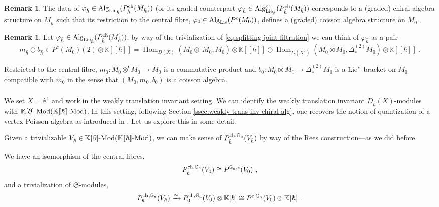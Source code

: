 \documentclass[11pt]{amsart}
\numberwithin{equation}{section}
\theoremstyle{definition}
\newtheorem{rmk}[theo]{Remark}
\newcommand{\bb}{\mathbb}
\newcommand{\mf}{\mathfrak}
\newcommand{\fph}{{[\![\hbar]\!]}}
\newcommand{\gd}{{\textup{gr}}}
\DeclareMathOperator{\Hom}{Hom}
\newcommand{\Mod}{{\textup{-Mod}}}
\newcommand{\ik}{{\bb K}}
\newcommand{\Alg}{{\textup{Alg}}}
\newcommand{\Lie}{{\textup{Lie}}}
\newcommand{\ch}{{\textup{ch}}}
\newcommand{\Ss}{{{\mf{S}}}}
\newcommand{\0}{{\textbf{0}}}
\newcommand{\del}{{{\partial}}}
\def\IA{\mathbb{A}}
\def\IG{\mathbb{G}}
\def\ch{{\rm ch}}
\def \mf{\mathfrak}
\def \hhb{{\hat \hbar}}
\begin{document}
\begin{rmk}\label{rmk:algebras in chiral Rees}
	The data of $\varphi_{\hat \hbar}\in \Alg_{\Lie_{\hat \hbar}}(P^\ch_{\hat \hbar}(M_{\hat \hbar}))$ (or its graded counterpart $\varphi_{\hat \hbar} \in \Alg^\gd_{\Lie_{\hat \hbar}}(P^\ch_{\hat \hbar}(M_{\hat \hbar}))$ corresponds to a (graded) chiral algebra structure on $M_{\hat \hbar}$ such that its restriction to the central fibre, $\varphi_0\in \Alg_{\Lie}(P^c(M_0))$, defines a (graded) coisson algebra structure on $M_0$.

\end{rmk}

\begin{rmk}\label{rmk:concrete algebraic sturcture in chiral Rees}
Let $\varphi_{\hat \hbar} \in \Alg_{\Lie_{\hat \hbar}}(P^\ch_{\hat \hbar}(M_{\hat \hbar}))$, by way of the trivialization of \eqref{eq:splitting joint filtration} we can think of $\varphi_{\hat \hbar}$ as a pair 
\[
m_{\hat \hbar}\oplus b_{\hat \hbar} \in P^c(M_0)(2)\otimes \ik\fph =  \Hom_{D(X)}(M_0\otimes^!M_0,M_0)\otimes\ik\fph\oplus \Hom_{D(X^2)}(M_0\boxtimes M_0,\Delta^{(2)}_*M_0)\otimes \ik\fph~.
\]

Restricted to the central fibre, $m_0 : M_0\otimes^!M_0\rightarrow M_0$ is a commutative product and $b_0:M_0\boxtimes M_0\to \Delta^{(2)}_*M_0$ is a $\Lie^*$-bracket on $M_0$ compatible with $m_0$ in the sense that $(M_0,m_0,b_0)$ is a coisson algebra.
\end{rmk}

\subsubsection{}

We set $X=\IA^1$ and work in the weakly translation invariant setting. We can identify the weakly translation invariant $D_\hhb(X)$-modules with $\ik[\del]\Mod(\ik\fph\Mod)$. In this setting, following Section \ref{ssec:weakly trans inv chiral alg}, one recovers the notion of quantization of a vertex Poisson algebra as introduced in \cite{Arakawa2015:local}. Let us explore this in some detail.



Given a trivializable $V_\hhb\in\ik[\del]\Mod(\ik\fph\Mod)$, we can make sense of $P^{\ch,\IG_a}_\hhb(V_\hhb)$ by way of the Rees construction---as we did before.

We have an isomorphism of the central fibres,
\[
P^{\ch,\IG_a}_\hhb(V_0)  \cong P^{\IG_a,c}(V_0)~, 
\]
and a trivialization of $\Ss$-modules,
\[
P^{\ch,\IG_a}_\hbar(V_\hbar) \xrightarrow{\sim} P^{\ch,\IG_a}_0(V_0)\otimes \ik[\hbar]\cong P^{c,\IG_a}(V_0)\otimes \ik[\hbar]~.
\]
\end{document}
